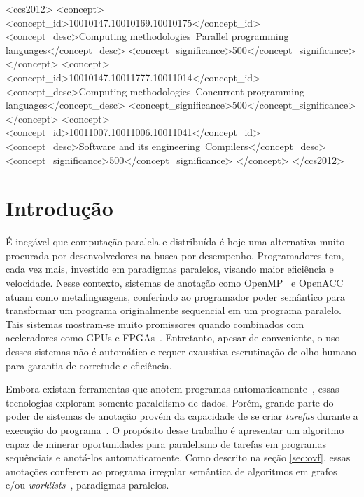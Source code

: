\documentclass[sigplan,10pt,review]{acmart}
\begin{document}
 \begin{CCSXML}
<ccs2012>
<concept>
<concept_id>10010147.10010169.10010175</concept_id>
<concept_desc>Computing methodologies~Parallel programming languages</concept_desc>
<concept_significance>500</concept_significance>
</concept>
<concept>
<concept_id>10010147.10011777.10011014</concept_id>
<concept_desc>Computing methodologies~Concurrent programming languages</concept_desc>
<concept_significance>500</concept_significance>
</concept>
<concept>
<concept_id>10011007.10011006.10011041</concept_id>
<concept_desc>Software and its engineering~Compilers</concept_desc>
<concept_significance>500</concept_significance>
</concept>
</ccs2012>
\end{CCSXML}



\maketitle

\section{Introdu\c{c}\~{a}o}
\label{sec:intro}

É inegável que computação paralela e distribuída é hoje uma alternativa muito procurada por 
desenvolvedores na busca por desempenho. Programadores tem, cada vez mais, investido
em paradigmas paralelos, visando maior eficiência e velocidade. Nesse contexto, sistemas de
anotação como OpenMP~\cite{JaegerCP15} e
OpenACC~\cite{OpenACC20} atuam como metalinguagens, conferindo ao programador
poder semântico para transformar um programa originalmente sequencial
em um programa paralelo. Tais sistemas mostram-se muito promissores quando
combinados com aceleradores como GPUs e FPGAs~\cite{Mendonca17,Poesia17}.
Entretanto, apesar de conveniente, o uso desses sistemas não é automático e
requer exaustiva escrutinação de olho humano para garantia de corretude e eficiência.

Embora existam ferramentas que anotem programas automaticamente~\cite{Mendonca16,Pingali11},
essas tecnologias exploram somente paralelismo de dados.  Porém, grande
parte do poder de sistemas de anotação provém da capacidade de se criar \textit{tarefas}
durante a execução do programa~\cite{Ayguade09}. O propósito desse trabalho
é apresentar um algoritmo capaz de minerar oportunidades para paralelismo de tarefas
em programas sequênciais e anotá-los automaticamente. Como descrito na seção \ref{sec:ovf},
essas anotações conferem ao programa irregular semântica de algoritmos em grafos e/ou \textit{worklists}~\cite{Pingali11}, paradigmas paralelos.
\end{document}
